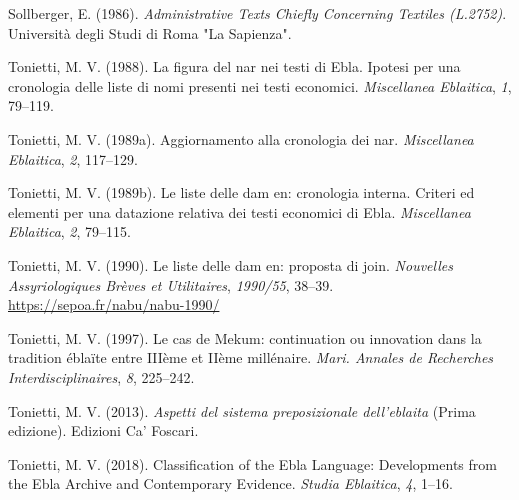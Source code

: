 \documentclass[
]{book}
\newlength{\cslhangindent}
\newlength{\cslentryspacingunit} %
\newenvironment{CSLReferences}[2] %
 {%
  \setlength{\parindent}{0pt}
  \ifodd #1
  \let\oldpar\par
  \def\par{\hangindent=\cslhangindent\oldpar}
  \fi
  \setlength{\parskip}{#2\cslentryspacingunit}
 }%
 {}
\begin{document}
\begin{CSLReferences}{1}{0}
\leavevmode{}%
Sollberger, E. (1986). \emph{Administrative {Texts Chiefly Concerning Textiles} ({L}.2752)}. Università degli Studi di Roma "La Sapienza".

\leavevmode{}%
Tonietti, M. V. (1988). La figura del nar nei testi di Ebla. Ipotesi per una cronologia delle liste di nomi presenti nei testi economici. \emph{Miscellanea Eblaitica}, \emph{1}, 79--119.

\leavevmode{}%
Tonietti, M. V. (1989a). Aggiornamento alla cronologia dei nar. \emph{Miscellanea Eblaitica}, \emph{2}, 117--129.

\leavevmode{}%
Tonietti, M. V. (1989b). Le liste delle dam en: cronologia interna. Criteri ed elementi per una datazione relativa dei testi economici di Ebla. \emph{Miscellanea Eblaitica}, \emph{2}, 79--115.

\leavevmode{}%
Tonietti, M. V. (1990). Le liste delle dam en: proposta di join. \emph{Nouvelles Assyriologiques Brèves et Utilitaires}, \emph{1990/55}, 38--39. \url{https://sepoa.fr/nabu/nabu-1990/}

\leavevmode{}%
Tonietti, M. V. (1997). Le cas de Mekum: continuation ou innovation dans la tradition éblaïte entre IIIème et IIème millénaire. \emph{Mari. Annales de Recherches Interdisciplinaires}, \emph{8}, 225--242.

\leavevmode{}%
Tonietti, M. V. (2013). \emph{Aspetti del sistema preposizionale dell'eblaita} (Prima edizione). Edizioni Ca' Foscari.

\leavevmode{}%
Tonietti, M. V. (2018). Classification of the {Ebla Language}: {Developments} from the {Ebla Archive} and {Contemporary Evidence}. \emph{Studia Eblaitica}, \emph{4}, 1--16.

\end{CSLReferences}
\end{document}
